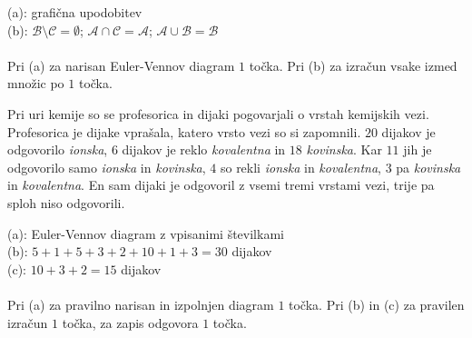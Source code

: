 \documentclass[addpoints]{exam}
\begin{document}
\begin{questions}

    \begin{solution}[7cm]
        (a): grafična upodobitev \\
        (b): $\mathcal{B}\setminus\mathcal{C}=\emptyset$; $\mathcal{A}\cap\mathcal{C}=\mathcal{A}$; $\mathcal{A}\cup\mathcal{B}=\mathcal{B}$ \\ \\
        Pri (a) za narisan Euler-Vennov diagram $1$ točka. Pri (b) za izračun vsake izmed množic po $1$ točka.
    \end{solution}






    
    \question
    Pri uri kemije so se profesorica in dijaki pogovarjali o vrstah kemijskih vezi.  Profesorica je dijake vprašala, katero vrsto vezi so si zapomnili.
    $20$ dijakov je odgovorilo \textit{ionska}, $6$ dijakov je reklo \textit{kovalentna} in $18$ \textit{kovinska}. Kar $11$ jih je odgovorilo samo \textit{ionska} in \textit{kovinska}, $4$ so rekli \textit{ionska} in \textit{kovalentna},
    $3$ pa \textit{kovinska} in \textit{kovalentna}. En sam dijaki je odgovoril z vsemi tremi vrstami vezi, trije pa sploh niso odgovorili. 

    \begin{solution}[8cm]
        (a): Euler-Vennov diagram z vpisanimi številkami \\
        (b): $5+1+5+3+2+10+1+3=30$ dijakov \\
        (c): $10+3+2=15$ dijakov \\ \\
        Pri (a) za pravilno narisan in izpolnjen diagram $1$ točka. Pri (b) in (c) za pravilen izračun $1$ točka, za zapis odgovora $1$ točka.
    \end{solution}





\end{questions}
\end{document}
